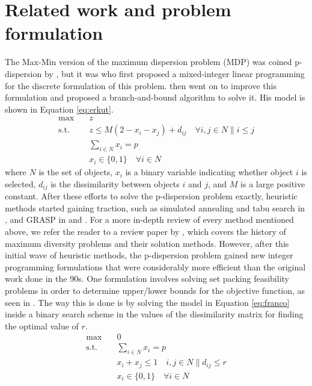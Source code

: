 \documentclass[preprint,12pt]{elsarticle}
\begin{document}
\section{Related work and problem formulation}
The Max-Min version of the maximum dispersion problem (MDP) was coined p-dispersion by \citet{Moon1984-zi}, but it was \citet{Kuby1988-ii} who first proposed a mixed-integer linear programming for the discrete formulation of this problem. 
\citet{Erkut1990-mo} then went on to improve this formulation and proposed a branch-and-bound algorithm to solve it. His model is shown in Equation \ref{eq:erkut}.
\begin{equation}
    \label{eq:erkut}
    \begin{aligned}
        \max \quad & z \\
        \text{s.t.} \quad & z \leq M(2 - x_i - x_j) + d_{ij} \quad \forall i,j \in N \| i \leq j \\
        & \sum_{i \in N} x_i = p \\
        & x_i \in \{0,1\} \quad \forall i \in N
    \end{aligned}
\end{equation}
where $N$ is the set of objects, $x_i$ is a binary variable indicating whether object $i$ is selected, $d_{ij}$ is the dissimilarity between objects $i$ and $j$, and $M$ is a large positive constant. 
After these efforts to solve the p-dispersion problem exactly, heuristic methods started gaining traction, such as simulated annealing and tabu search in \citet{Kincaid1992-mp}, and GRASP in \citet{Ghosh1996-zm} and \citet{Resende2010-vr}. For a more in-depth
review of every method mentioned above, we refer the reader to a review paper by \citet{Marti2022-ku}, which covers the history of maximum diversity problems and their solution methods. 
However, after this initial wave of heuristic methods, the p-dispersion problem gained new integer programming formulations that were considerably more efficient than the original work done in the 90s. One formulation involves solving set packing
feasibility problems in order to determine upper/lower bounds for the objective function, as seen in \citet{franco2015solving}. The way this is done is by solving the model in Equation \ref{eq:franco} inside a binary search
scheme in the values of the dissimilarity matrix for finding the optimal value of $r$.
\begin{equation}
    \label{eq:franco}
    \begin{aligned}
        \max \quad & 0 \\
        \text{s.t.} \quad & \sum_{i \in N} x_i = p \\
        & x_i + x_j \leq 1 \quad i,j \in N \| d_{ij} \leq r \\
        & x_i \in \{0,1\} \quad \forall i \in N
    \end{aligned}
\end{equation}
\end{document}
